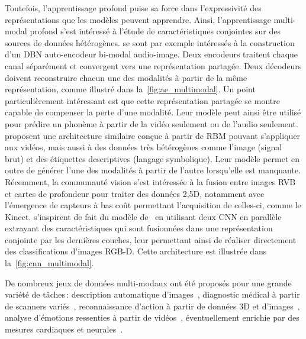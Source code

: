 Toutefois, l'apprentissage profond puise sa force dans l'expressivité des représentations que les modèles peuvent apprendre. Ainsi, l'apprentissage multi-modal profond s'est intéressé à l'étude de caractéristiques conjointes sur des sources de données hétérogènes. \citet{ngiam_multimodal_2011} se sont par exemple intéressés à la construction d'un \gls{DBN} auto-encodeur bi-modal audio-image. Deux encodeurs traitent chaque canal séparément et convergent vers une représentation partagée. Deux décodeurs doivent reconstruire chacun une des modalités à partir de la même représentation, comme illustré dans la~\cref{fig:ae_multimodal}. Un point particulièrement intéressant est que cette représentation partagée se montre capable de compenser la perte d'une modalité. Leur modèle peut ainsi être utilisé pour prédire un phonème à partir de la vidéo seulement ou de l'audio seulement.
\cite{srivastava_multimodal_2014} proposent une architecture similaire conçue à partir de \gls{RBM} pouvant s'appliquer aux vidéos, mais aussi à des données très hétérogènes comme l'image (signal brut) et des étiquettes descriptives (langage symbolique). Leur modèle permet en outre de générer l'une des modalités à partir de l'autre lorsqu'elle est manquante.
Récemment, la communauté vision s'est intéressée à la fusion entre images \gls{RVB} et cartes de profondeur pour traiter des données 2,5D, notamment avec l'émergence de capteurs à bas coût permettant l'acquisition de celles-ci, comme le Kinect. \citet{eitel_multimodal_2015} s'inspirent de fait du modèle de~\citet{ngiam_multimodal_2011} en utilisant deux \gls{CNN} en parallèle extrayant des caractéristiques qui sont fusionnées dans une représentation conjointe par les dernières couches, leur permettant ainsi de réaliser directement des classifications d'images \gls{RGB-D}. Cette architecture est illustrée dans la~\cref{fig:cnn_multimodal}.

De nombreux jeux de données multi-modaux ont été proposés pour une grande variété de tâches\,: description automatique d'images~\cite{hodosh_framing_2013}, diagnostic médical à partir de scanners variés~\cite{menze_multimodal_2015}, reconnaissance d'action à partir de données 3D et d'images~\cite{ofli_berkeley_2013}, analyse d'émotions ressenties à partir de vidéos~\cite{schuller_avec_2011}, éventuellement enrichie par des mesures cardiaques et neurales~\cite{ringeval_introducing_2013}.


